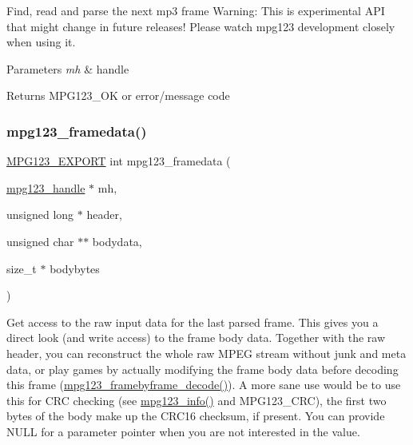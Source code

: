 Find, read and parse the next mp3 frame Warning\+: This is experimental A\+PI that might change in future releases! Please watch mpg123 development closely when using it. 
\begin{DoxyParams}{Parameters}
{\em mh} & handle \\
\hline
\end{DoxyParams}
\begin{DoxyReturn}{Returns}
M\+P\+G123\+\_\+\+OK or error/message code 
\end{DoxyReturn}
\mbox{\label{group__mpg123__input_gaa4c4e18d7defd6e5fb7addc3caf8d946}} 
\subsubsection{\texorpdfstring{mpg123\_framedata()}{mpg123\_framedata()}}
{\footnotesize\ttfamily \mbox{\hyperlink{mpg123_8h_a2ba98cfba3f760879df70e755b2a61cc}{M\+P\+G123\+\_\+\+E\+X\+P\+O\+RT}} int mpg123\+\_\+framedata (\begin{DoxyParamCaption}\item[{\mbox{\hyperlink{group__mpg123__init_ga6728e2839a395f3a07d4514da659faca}{mpg123\+\_\+handle}} $\ast$}]{mh,  }\item[{unsigned long $\ast$}]{header,  }\item[{unsigned char $\ast$$\ast$}]{bodydata,  }\item[{size\+\_\+t $\ast$}]{bodybytes }\end{DoxyParamCaption})}

Get access to the raw input data for the last parsed frame. This gives you a direct look (and write access) to the frame body data. Together with the raw header, you can reconstruct the whole raw M\+P\+EG stream without junk and meta data, or play games by actually modifying the frame body data before decoding this frame (\mbox{\hyperlink{group__mpg123__input_gad6e52cca146bcd6db3954e88fb86bc82}{mpg123\+\_\+framebyframe\+\_\+decode()}}). A more sane use would be to use this for C\+RC checking (see \mbox{\hyperlink{group__mpg123__status_ga2f3357b968c78a77ad456a3200820ba8}{mpg123\+\_\+info()}} and M\+P\+G123\+\_\+\+C\+RC), the first two bytes of the body make up the C\+R\+C16 checksum, if present. You can provide N\+U\+LL for a parameter pointer when you are not interested in the value.


